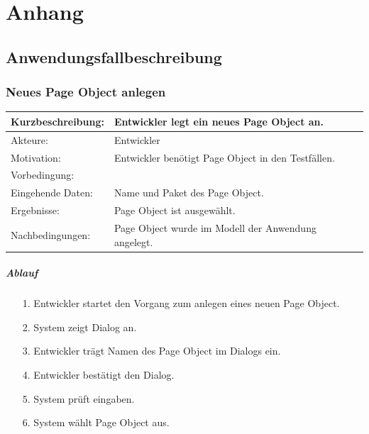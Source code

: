 \appendix
\chapter{Anhang}
\section{Anwendungsfallbeschreibung}
\label{anhang:anwendungsfallbeschreibung}
\subsection{Neues Page Object anlegen}
\label{sec:neues_page_object_anlegen}

\begin{tabular}[h]{|p{4cm}|p{}|}
\hline 
\rule[-1ex]{0pt}{2.5ex}Kurzbeschreibung: & 
Entwickler legt ein neues Page Object an. \\  
\hline 
\rule[-1ex]{0pt}{2.5ex}Akteure: & 
Entwickler \\ 
\hline 
\rule[-1ex]{0pt}{2.5ex}Motivation: & 
Entwickler benötigt Page Object in den Testfällen. \\ 
\hline 
\rule[-1ex]{0pt}{2.5ex}Vorbedingung: &  \\ 
\hline 
\rule[-1ex]{0pt}{2.5ex}Eingehende Daten: & Name und Paket des Page Object. \\ 
\hline 
\rule[-1ex]{0pt}{2.5ex}Ergebnisse: & Page Object ist ausgewählt. \\ 
\hline 
\rule[-1ex]{0pt}{2.5ex}Nachbedingungen: & Page Object wurde im Modell der Anwendung angelegt.  \\ 
\hline 
\end{tabular} 

\paragraph{Ablauf}

\begin{itemize}[itemsep=0pt]
\item[1.] Entwickler startet den Vorgang zum anlegen eines neuen Page Object. 
\item[2.] System zeigt Dialog an. 
\item[3.] Entwickler trägt Namen des Page Object im Dialogs ein.
\item[4.] Entwickler bestätigt den Dialog.
\item[5.] System prüft eingaben.
\item[6.] System wählt Page Object aus.
\end{itemize}

